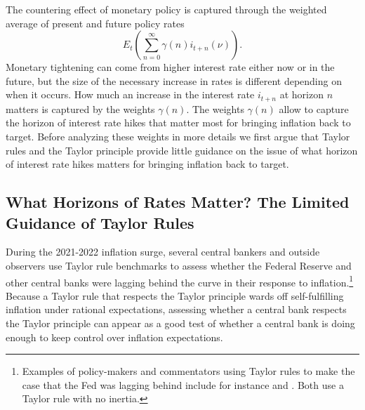 \documentclass{article}
\begin{document}
The countering effect of monetary policy is captured through the weighted average of present and future policy rates
\begin{equation}
E_t\left(\sum_{n=0}^{\infty} \gamma(n) i_{t+n}(\nu)\right).\label{eq_tighteningeffect}
\end{equation}
Monetary tightening can come from higher interest rate either now or in the future, but the size of the necessary increase in rates is different depending on when it occurs. How much an increase in the interest rate $i_{t+n}$ at horizon $n$ matters is captured by the weights $\gamma(n)$. The weights $\gamma(n)$ allow to capture the horizon of interest rate hikes that matter most for bringing inflation back to target. Before analyzing these weights in more details we first argue that Taylor rules and the Taylor principle provide little guidance on the issue of what horizon of interest rate hikes matters for bringing inflation back to target.

\subsection{What Horizons of Rates Matter? The Limited Guidance of Taylor Rules}
During the 2021-2022 inflation surge, several central bankers and outside observers use Taylor rule benchmarks to assess whether the Federal Reserve and other central banks were lagging behind the curve in their response to inflation.\footnote{Examples of policy-makers and commentators using Taylor rules to make the case that the Fed was lagging behind include for instance \cite{Bullard} and \cite{BuiterSibert}. Both use a Taylor rule with no inertia.} Because a Taylor rule that respects the Taylor principle wards off self-fulfilling inflation under rational expectations, assessing whether a central bank respects the Taylor principle can appear as a good test of whether a central bank is doing enough to keep control over inflation expectations. 
\end{document}
